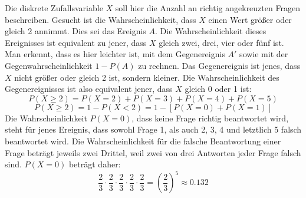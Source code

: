Die diskrete Zufallsvariable $X$ soll hier die Anzahl an richtig angekreuzten Fragen beschreiben. Gesucht ist die Wahrscheinlichkeit, dass $X$ einen Wert gr\"{o}\ss{}er oder gleich 2 annimmt. Dies sei das Ereignis $A$. Die Wahrscheinlichkeit dieses Ereignisses ist equivalent zu jener, dass $X$ gleich zwei, drei, vier oder f\"{u}nf ist. Man erkennt, dass es hier leichter ist, mit dem Gegenereignis $A'$ sowie mit der Gegenwahrscheinlichkeit $1 - P(A)$ zu rechnen. Das Gegenereignis ist jenes, dass $X$ nicht gr\"{o}\ss{}er oder gleich 2 ist, sondern kleiner. Die Wahrscheinlichkeit des Gegenereignisses ist also equivalent jener, dass $X$ gleich 0 oder 1 ist: $$P(X \geq 2) = P(X=2) + P(X=3) + P(X=4) + P(X=5)$$ $$P(X \geq 2) = 1 - P(X < 2) = 1 - [P(X=0) + P(X=1)]$$ Die Wahrscheinlichkeit $P(X = 0)$, dass keine Frage richtig beantwortet wird, steht f\"{u}r jenes Ereignis, dass sowohl Frage 1, als auch 2, 3, 4 und letztlich 5 falsch beantwortet wird. Die Wahrscheinlichkeit f\"{u}r die falsche Beantwortung einer Frage betr\"{a}gt jeweils zwei Drittel, weil zwei von drei Antworten jeder Frage falsch sind. $P(X = 0)$ betr\"{a}gt daher: $$\frac{2}{3} \cdot \frac{2}{3} \cdot \frac{2}{3} \cdot \frac{2}{3} \cdot \frac{2}{3} = \left(\frac{2}{3}\right)^5 \approx 0.132$$

